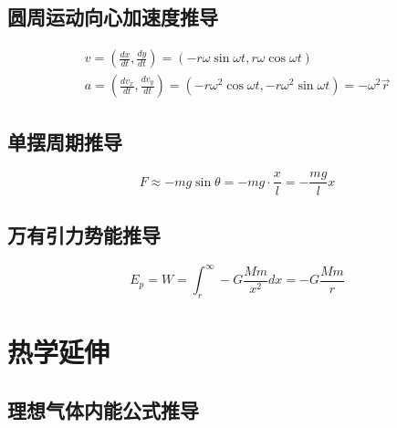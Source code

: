 \subsection{圆周运动向心加速度推导}

\begin{gather*}
    v=\left(\frac{dx}{dt},\frac{dy}{dt}\right)
    =(-r\omega\sin\omega t,r\omega\cos\omega t)\\
    a=\left(\frac{dv_x}{dt},\frac{dv_y}{dt}\right)
    =(-r\omega^2\cos\omega t,-r\omega^2\sin\omega t)
    =-\omega^2\vec{r}
\end{gather*}

\subsection{单摆周期推导}

\begin{equation*}
    F\approx -mg\sin\theta=-mg\cdot\frac{x}{l}=-\frac{mg}{l}x
\end{equation*}

\subsection{万有引力势能推导}

\begin{equation*}
    E_p=W=\int_r^\infty-G\frac{Mm}{x^2}dx=-G\frac{Mm}{r}
\end{equation*}

\section{热学延伸}

\subsection{理想气体内能公式推导}

